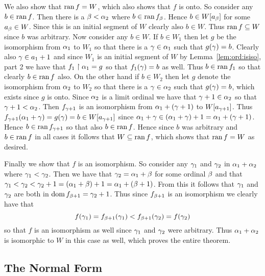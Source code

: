 \begin{questions}
{{      We also show that $\mathrm{ran}\, f = W$, which also shows that $f$ is onto.
      So consider any $b \in \mathrm{ran}\, f$.
      Then there is a $\beta < \alpha_2$ where $b \in \mathrm{ran}\, f_\beta$.
      Hence $b \in W[a_\beta]$ for some $a_\beta \in W$.
      Since this is an initial segment of $W$ clearly also $b \in W$.
      Thus $\mathrm{ran}\, f \subseteq W$ since $b$ was arbitrary.
      Now consider any $b \in W$.
      If $b \in W_1$ then let $g$ be the isomorphism from $\alpha_1$ to $W_1$ so that there is a $\gamma \in \alpha_1$ such that $g(\gamma) = b$.
      Clearly also $\gamma \in a_1 + 1$ and since $W_1$ is an initial segment of $W$ by Lemma~\ref{lem:ord:isiso}, part 2 we have that $f_1 \restriction \alpha_1 = g$ so that $f_1(\gamma) = b$ as well.
      Thus $b \in \mathrm{ran}\, f_1$ so that clearly $b \in \mathrm{ran}\, f$ also.
      On the other hand if $b \in W_2$ then let $g$ denote the isomorphism from $\alpha_2$ to $W_2$ so that there is a $\gamma \in \alpha_2$ such that $g(\gamma) = b$, which exists since $g$ is onto.
      Since $\alpha_2$ is a limit ordinal we have that $\gamma+1 \in \alpha_2$ so that $\gamma+1 < \alpha_2$.
      Then $f_{\gamma+1}$ is an isomorphism from $\alpha_1 + (\gamma+1)$ to $W[a_{\gamma+1}]$.
      Thus $f_{\gamma+1}(\alpha_1 + \gamma) = g(\gamma) = b \in W[a_{\gamma+1}]$ since $\alpha_1 + \gamma \in (\alpha_1 + \gamma) + 1 = \alpha_1 + (\gamma+1)$.
      Hence $b \in \mathrm{ran}\, f_{\gamma+1}$ so that also $b \in \mathrm{ran}\, f$.
      Hence since $b$ was arbitrary and $b \in \mathrm{ran}\, f$ in all cases it follows that $W \subseteq \mathrm{ran}\, f$, which shows that $\mathrm{ran}\, f = W$ as desired.

      Finally we show that $f$ is an isomorphism.
      So consider any $\gamma_1$ and $\gamma_2$ in $\alpha_1 + \alpha_2$ where $\gamma_1 < \gamma_2$.
      Then we have that $\gamma_2 = \alpha_1 + \beta$ for some ordinal $\beta$ and that $\gamma_1 < \gamma_2 < \gamma_2 + 1 = (\alpha_1 + \beta) + 1 = \alpha_1 + (\beta + 1)$.
      From this it follows that $\gamma_1$ and $\gamma_2$ are both in $\mathrm{dom}\, f_{\beta+1} = \gamma_2 + 1$.
      Thus since $f_{\beta+1}$ is an isomorphism we clearly have that
      $$
        f(\gamma_1) = f_{\beta+1}(\gamma_1) < f_{\beta+1}(\gamma_2)= f(\gamma_2)
      $$
      so that $f$ is an isomorphism as well since $\gamma_1$ and $\gamma_2$ were arbitrary.
      Thus $\alpha_1 + \alpha_2$ is isomorphic to $W$ in this case as well, which proves the entire theorem.
    }
  }

  \subsection{The Normal Form}


\end{questions}
